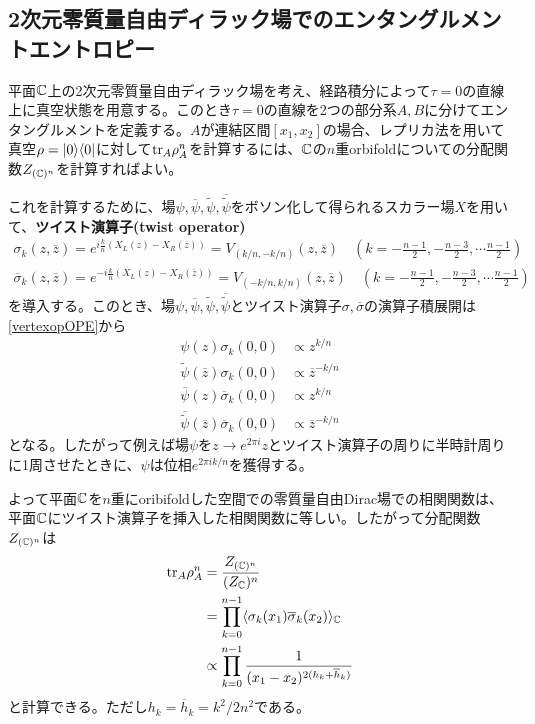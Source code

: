 \subsection{2次元零質量自由ディラック場でのエンタングルメントエントロピー}
平面$\mathbb{C}$上の2次元零質量自由ディラック場を考え、経路積分によって$\tau=0$の直線上に真空状態を用意する。このとき$\tau=0$の直線を2つの部分系$A,B$に分けてエンタングルメントを定義する。$A$が連結区間$[x_1,x_2]$の場合、レプリカ法を用いて真空$\rho=|0\rangle\langle 0|$に対して$\textnormal{tr}_A \rho_A^n$を計算するには、$\mathbb{C}$の$n$重orbifoldについての分配関数$Z_{(\mathbb{C})^n}$を計算すればよい。

これを計算するために、場$\psi,\overline{\psi},\tilde{\psi},\overline{\tilde{\psi}}$をボソン化して得られるスカラー場$X$を用いて、\textbf{ツイスト演算子(twist operator)}
\begin{align}\label{twistopscalarplane}
\sigma_k(z,\overline{z})=e^{i\frac{k}{n}(X_L(z)-X_R(\overline{z}))}=V_{(k/n,-k/n)}(z,\overline{z})\quad \left(k=-\frac{n-1}{2},-\frac{n-3}{2},\cdots \frac{n-1}{2}\right)\\
\overline{\sigma}_k(z,\overline{z})=e^{-i\frac{k}{n}(X_L(z)-X_R(\overline{z}))}=V_{(-k/n,k/n)}(z,\overline{z})\quad \left(k=-\frac{n-1}{2},-\frac{n-3}{2},\cdots \frac{n-1}{2}\right)
\end{align}
を導入する。このとき、場$\psi,\overline{\psi},\tilde{\psi},\overline{\tilde{\psi}}$とツイスト演算子$\sigma,\overline{\sigma}$の演算子積展開は\ref{vertexopOPE}から
\begin{align}
\psi(z)\sigma_k(0,0)&\propto z^{k/n}\\
\tilde{\psi}(\overline{z})\sigma_k(0,0)&\propto \overline{z}^{-k/n}\\
\overline{\psi}(z)\overline{\sigma}_k(0,0)&\propto z^{k/n}\\
\overline{\tilde{\psi}}(\overline{z})\overline{\sigma}_k(0,0)&\propto \overline{z}^{-k/n}
\end{align}
となる。したがって例えば場$\psi$を$z\to e^{2\pi i}z$とツイスト演算子の周りに半時計周りに1周させたときに、$\psi$は位相$e^{2\pi ik/n}$を獲得する。

よって平面$\mathbb{C}$を$n$重にoribifoldした空間での零質量自由Dirac場での相関関数は、平面$\mathbb{C}$にツイスト演算子を挿入した相関関数に等しい。したがって分配関数$Z_{(\mathbb{C})^n}$は
\begin{align}
\textnormal{tr}_A \rho_A^n&=\frac{Z_{(\mathbb{C})^n}}{(Z_{\mathbb{C}})^n}\\
&=\prod_{k=0}^{n-1} \langle \sigma_k(x_1)\overline{\sigma}_k(x_2) \rangle_{\mathbb{C}}\\
&\propto \prod_{k=0}^{n-1}\frac{1}{(x_1-x_2)^{2(h_k+\overline{h}_k)}}
\end{align}
と計算できる。ただし$h_k=\overline{h}_k=k^2/2n^2$である。

